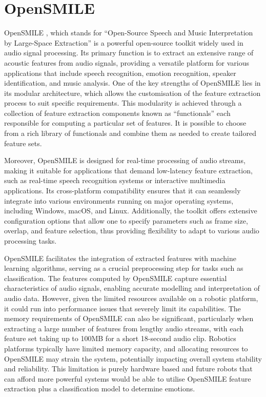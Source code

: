 \section{OpenSMILE}

OpenSMILE \cite{opensmile-2010}, which stands for ``Open-Source Speech and Music Interpretation by Large-Space Extraction'' is a powerful open-source toolkit widely used in audio signal processing. Its primary function is to extract an extensive range of acoustic features from audio signals, providing a versatile platform for various applications that include speech recognition, emotion recognition, speaker identification, and music analysis. One of the key strengths of OpenSMILE lies in its modular architecture, which allows the customisation of the feature extraction process to suit specific requirements. This modularity is achieved through a collection of feature extraction components known as ``functionals'' each responsible for computing a particular set of features. It is possible to choose from a rich library of functionals and combine them as needed to create tailored feature sets.

Moreover, OpenSMILE is designed for real-time processing of audio streams, making it suitable for applications that demand low-latency feature extraction, such as real-time speech recognition systems or interactive multimedia applications. Its cross-platform compatibility ensures that it can seamlessly integrate into various environments running on major operating systems, including Windows, macOS, and Linux. Additionally, the toolkit offers extensive configuration options that allow one to specify parameters such as frame size, overlap, and feature selection, thus providing flexibility to adapt to various audio processing tasks.

OpenSMILE facilitates the integration of extracted features with machine learning algorithms, serving as a crucial preprocessing step for tasks such as classification. The features computed by OpenSMILE capture essential characteristics of audio signals, enabling accurate modelling and interpretation of audio data. However, given the limited resources available on a robotic platform, it could run into performance issues that severely limit its capabilities. The memory requirements of OpenSMILE can also be significant, particularly when extracting a large number of features from lengthy audio streams, with each feature set taking up to 100MB for a short 18-second audio clip. Robotics platforms typically have limited memory capacity, and allocating resources to OpenSMILE may strain the system, potentially impacting overall system stability and reliability. This limitation is purely hardware based and future robots that can afford more powerful systems would be able to utilise OpenSMILE feature extraction plus a classification model to determine emotions.

